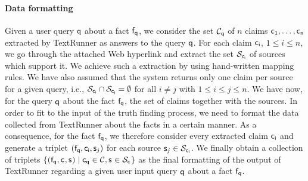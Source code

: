 \paragraph*{Data formatting}
Given a user query $\mathsf{q}$ about a fact $\mathsf{f}_{\mathsf{q}}$, we consider the set $\mathcal{C}_{\mathsf{q}}$ 
of $n$ claims $\mathsf{c_{1}}, \ldots, \mathsf{c_{n}}$ extracted by TextRunner as answers to the query $\mathsf{q}$.
For each claim $\mathsf{c_{i}}$, $1\leq i\leq n$, we go through the attached Web hyperlink and extract the set
$\mathcal{S}_{\mathsf{c_{i}}}$ of sources which support it. We achieve such a extraction by using hand-written mapping 
rules. We have also assumed that the system returns only one claim per source for a given query, i.e., $\mathcal{S}_{\mathsf{c_{i}}}
\cap \mathcal{S}_{\mathsf{c_{j}}}=\emptyset$ for all $i\neq j$ with $1\leq i\leq j\leq n$. We have now, for the query
$\mathsf{q}$ about the fact $\mathsf{f}_{\mathsf{q}}$, the set of claims together with the sources. In order to fit to 
the input of the truth finding process, we need to format the data collected from TextRunner about the 
facts in a certain manner. As a consequence, for the fact $\mathsf{f}_{\mathsf{q}}$, we therefore consider every extracted 
claim $\mathsf{c_{i}}$ and generate a triplet $(\mathsf{f}_{\mathsf{q}}, \mathsf{c_{i}}, \mathsf{s}_{j})$ for each source $\mathsf{s}_{j}\in \mathcal{S}_{\mathsf{c_{i}}}$.
We finally obtain a collection of triplets $\{(\mathsf{f}_{\mathsf{q}}, \mathsf{c_{}}, \mathsf{s}_{})\mid \mathsf{c_{\mathsf{q}}}\in \mathcal{C}, \mathsf{s}_{} \in \mathcal{S}_{\mathsf{c_{}}}\}$ 
as the final formatting of the output of TextRunner regarding a given user input query $\mathsf{q}$ about a fact $\mathsf{f}_{\mathsf{q}}$. 



